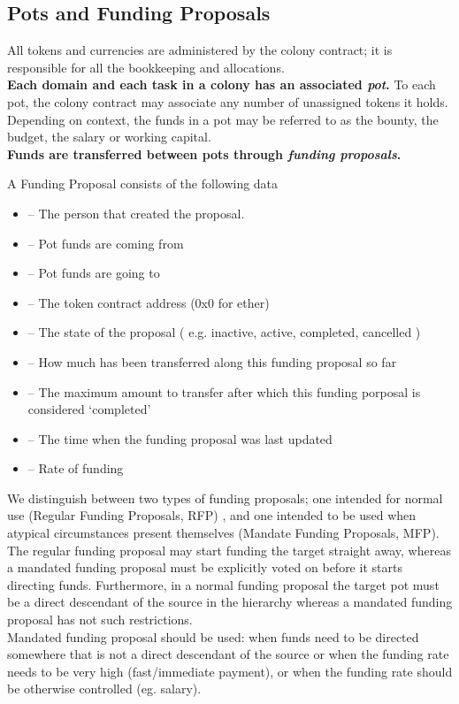 \subsection{Pots and Funding Proposals}\label{sec:pots-and-fp}
All tokens and currencies are administered by the colony contract; it is responsible for all the bookkeeping and allocations.\\
\textbf{Each domain and each task in a colony has an associated \emph{pot}.} To each pot, the colony contract may associate any number of unassigned tokens it holds. Depending on context, the funds in a pot may be referred to as the bounty, the budget, the salary or working capital.\\
\textbf{Funds are transferred between pots through \emph{funding proposals}.}
\begin{description}
 \item A Funding Proposal consists of the following data
 \begin{itemize}
  \item {}	--	The person that created the proposal.
  \item {}	--	Pot funds are coming from
  \item {}	--	Pot funds are going to
  \item {}	--	The token contract address (0x0 for ether)
  \item {}	--	The state of the proposal ( e.g. inactive, active, completed, cancelled )
  \item {}	--	How much has been transferred along this funding proposal so far
  \item {}	--	The maximum amount to transfer after which this funding porposal is considered `completed'
  \item {}	--	The time when the funding proposal was last updated
  \item {}	--	Rate of funding
 \end{itemize}

\end{description}
We distinguish between two types of funding proposals; one intended for normal use (Regular Funding Proposals, RFP) , and one intended to be used when atypical circumstances present themselves (Mandate Funding Proposals, MFP). The regular funding proposal may start funding the target straight away, whereas a mandated funding proposal must be explicitly voted on before it starts directing funds. Furthermore, in a normal funding proposal the target pot must be a direct descendant of the source in the hierarchy whereas a mandated funding proposal has not such restrictions.\\
Mandated funding proposal should be used: when funds need to be directed somewhere that is not a direct descendant of the source or when the funding rate needs to be very high (fast/immediate payment), or when the funding rate should be otherwise controlled (eg. salary).\\

